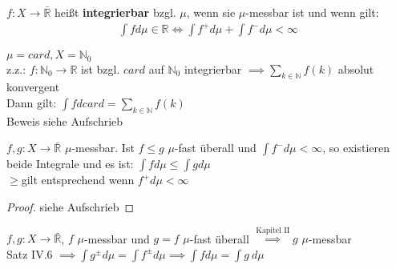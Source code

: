 \documentclass[11pt,a4paper,fleqn,openany]{report}
\begin{document}
    \begin{definition}
      $f:X \to \bar{\mathbb{R}}$ heißt \textbf{integrierbar} bzgl. $\mu$, wenn sie $\mu$-messbar ist und wenn gilt:
      \begin{align*}
        \int f d\mu \in \mathbb{R} \Leftrightarrow \int f^+ d\mu + \int f^- d\mu < \infty
      \end{align*}
    \end{definition}

    \begin{example}
      $\mu = card, X = \mathbb{N}_0$\\
      z.z.: $f: \mathbb{N}_0 \to \mathbb{R}$ ist bzgl. $card$ auf $\mathbb{N}_0$ integrierbar $\implies \sum\limits_{k \in \mathbb{N}} f(k)$ absolut konvergent\\
      Dann gilt: $\int f d card = \sum\limits_{k \in \mathbb{N}} f(k)$\\
      Beweis siehe Aufschrieb
    \end{example}

    \begin{theorem}
      $f,g:X \to \bar{\mathbb{R}}$ $\mu$-messbar. Ist $f \leq g$ $\mu$-fast überall und $\int f^- d\mu < \infty$, so existieren beide Integrale und es ist: $\int f d\mu \leq \int g d\mu$\\
      \glqq$\geq$\grqq gilt entsprechend wenn $f^+ d\mu < \infty$
    \end{theorem}

    \begin{proof}
      siehe Aufschrieb
    \end{proof}

    \begin{remark}
      $f,g: X \to \bar{\mathbb{R}}$, $f$ $\mu$-messbar und $g = f$ $\mu$-fast überall $\stackrel{\text{Kapitel II}}{\implies} g$ $\mu$-messbar\\
      Satz IV.6 $\implies \int g^{\pm} d\mu = \int f^{\pm} d\mu \implies \int f d\mu = \int g \ d\mu$
    \end{remark}
\end{document}
